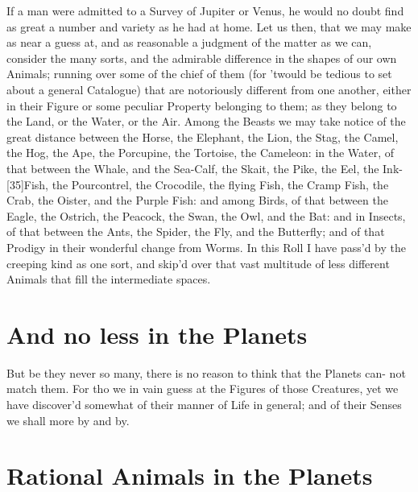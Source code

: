 \documentclass[letterpaper]{book}
\begin{document}
If a man were admitted to a Survey of Jupiter or Venus, he would no doubt
find as great a number and variety as he had at home. Let us then, that we
may make as near a guess at, and as reasonable a judgment of the matter
as we can, consider the many sorts, and the admirable difference in the
shapes of our own Animals; running over some of the chief of them (for
'twould be tedious to set about a general Catalogue) that are notoriously
different from one another, either in their Figure or some peculiar Property
belonging to them; as they belong to the Land, or the Water, or the Air.
Among the Beasts we may take notice of the great distance between the
Horse, the Elephant, the Lion, the Stag, the Camel, the Hog, the Ape, the
Porcupine, the Tortoise, the Cameleon: in the Water, of that between the
Whale, and the Sea-Calf, the Skait, the Pike, the Eel, the Ink-[35]Fish, the
Pourcontrel, the Crocodile, the flying Fish, the Cramp Fish, the Crab, the
Oister, and the Purple Fish: and among Birds, of that between the Eagle,
the Ostrich, the Peacock, the Swan, the Owl, and the Bat: and in Insects,
of that between the Ants, the Spider, the Fly, and the Butterfly; and of that
Prodigy in their wonderful change from Worms. In this Roll I have pass'd
by the creeping kind as one sort, and skip'd over that vast multitude of less
different Animals that fill the intermediate spaces.


\section{And no less in the Planets}

But be they never so many, there is no reason to think that the Planets can-
not match them. For tho we in vain guess at the Figures of those Creatures,
yet we have discover'd somewhat of their manner of Life in general; and of
their Senses we shall more by and by.


\section{Rational Animals in the Planets}
\end{document}
